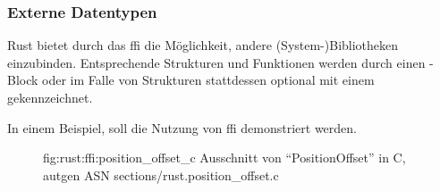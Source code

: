 \subsubsection{Externe Datentypen}
\label{rust:ffi:datatypes}

Rust bietet durch das \gls{ffi} die Möglichkeit, andere (System-)Bibliotheken einzubinden.
Entsprechende Strukturen und Funktionen werden durch einen -Block
oder im Falle von Strukturen stattdessen optional mit einem \rustcinline{#[repr(C)]} gekennzeichnet.

In einem Beispiel, soll die Nutzung von \gls{ffi} demonstriert werden.

\begin{figure}[H]
	\ccinclude
		{fig:rust:ffi:position_offset_c}
		{Ausschnitt von \enquote{PositionOffset}  in C, autgen ASN}
		{sections/rust.position_offset.c}
	
\end{figure}


